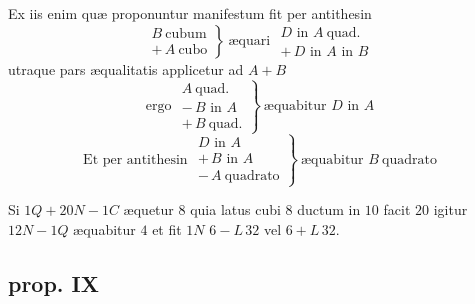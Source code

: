 \documentclass[11pt,a4paper]{article}
\begin{document}
Ex iis enim quæ proponuntur manifestum fit per antithesin
\[ \left.\begin{array}{l} B\ \text{cubum} \\ +\,A\ \text{cubo} \end{array}\right\}\ \text{æquari } \begin{array}{l} D \text{ in } A\ \text{quad.} \\ +\,D \text{ in } A \text{ in } B \end{array} \]
utraque pars æqualitatis applicetur ad $A + B$
\[ \text{ergo } \left.\begin{array}{l} A\ \text{quad.} \\ -\,B \text{ in } A \\ +\,B\ \text{quad.} \end{array}\right\}\ \text{æquabitur } D \text{ in } A \]
\[ \text{Et per antithesin } \left.\begin{array}{l} D \text{ in } A \\ +\,B \text{ in } A \\ -\,A\ \text{quadrato} \end{array}\right\}\ \text{æquabitur } B\ \text{quadrato} \]

Si $1Q + 20N - 1C$ æquetur $8$ quia latus cubi $8$ ductum in $10$ facit $20$ igitur $12N - 1Q$ æquabitur $4$ et fit $1N$ $6 - L\,32$ vel $6 + L\,32$.

\subsection*{prop. IX}
\end{document}
